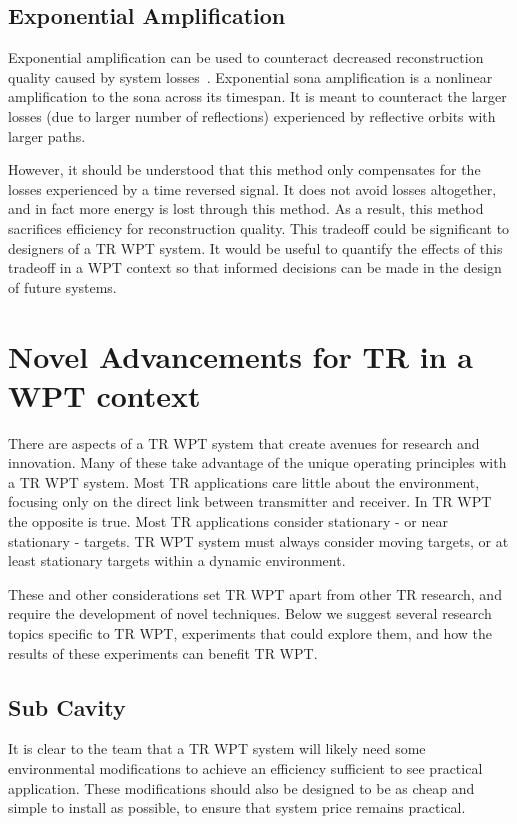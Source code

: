 \subsection{Exponential Amplification}

Exponential amplification can be used to counteract decreased reconstruction quality caused by system losses~\cite{bini-thesis}. Exponential sona amplification is a nonlinear amplification to the sona across its timespan. It is meant to counteract the larger losses (due to larger number of reflections) experienced by reflective orbits with larger paths.

However, it should be understood that this method only compensates for the losses experienced by a time reversed signal. It does not avoid losses altogether, and in fact more energy is lost through this method. As a result, this method sacrifices efficiency for reconstruction quality. This tradeoff could be significant to designers of a TR WPT system. It would be useful to quantify the effects of this tradeoff in a WPT context so that informed decisions can be made in the design of future systems.

\section{Novel Advancements for TR in a WPT context}
\label{sec:future-wpt}

There are aspects of a TR WPT system that create avenues for research and innovation. Many of these take advantage of the unique operating principles with a TR WPT system. Most TR applications care little about the environment, focusing only on the direct link between transmitter and receiver. In TR WPT the opposite is true. Most TR applications consider stationary - or near stationary - targets. TR WPT system must always consider moving targets, or at least stationary targets within a dynamic environment.

These and other considerations set TR WPT apart from other TR research, and require the development of novel techniques. Below we suggest several research topics specific to TR WPT, experiments that could explore them, and how the results of these experiments can benefit TR WPT.

\subsection{Sub Cavity}
\label{sec:future-sub-cavity}

It is clear to the team that a TR WPT system will likely need some environmental modifications to achieve an efficiency sufficient to see practical application. These modifications should also be designed to be as cheap and simple to install as possible, to ensure that system price remains practical.

